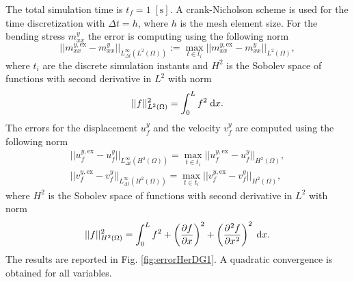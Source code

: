 \documentclass{svjour3}                     %
\begin{document}
{\begin{table}[tbh]
\begin{tabular}{ccccc}
		\hline 
	\end{tabular} 
	\captionsetup{width=0.95\linewidth}
	\vspace{1mm}
	\label{tab:parEB}
\end{table}
The total simulation time is $t_f = 1 \; [\mathrm{s}]$. A crank-Nicholson scheme is used for the time discretization with $\Delta t = h$, where $h$ is the mesh element size. For the bending stress $m_{xx}^y$ the error is computing using the following norm
\begin{equation*}
||m_{xx}^{y, \text{ex}} -  m_{xx}^{y}||_{L^\infty_{\Delta t} (L^2(\Omega))} := \max_{t \in t_i} ||m_{xx}^{y, \text{ex}} -  m_{xx}^{y}||_{L^2(\Omega)}, 
\end{equation*}
where $t_i$ are the discrete simulation instants and $H^2$ is the Sobolev space of functions with second derivative in $L^2$ with norm
\begin{equation*}
||f||^2_{L^2(\Omega)} = \int_{0}^{L} f^2\d{x}.
\end{equation*}
The errors for the displacement $u_f^{y}$ and the velocity $v_f^{y}$ are computed using the following norm
\begin{equation*}
\begin{aligned}
||u_f^{y, \text{ex}} -  u_f^{y}||_{L^\infty_{\Delta t} (H^2(\Omega))} = \max_{t \in t_i} ||u_f^{y, \text{ex}} -  u_f^{y}||_{H^2(\Omega)}, \\
||v_f^{y, \text{ex}} -  v_f^{y}||_{L^\infty_{\Delta t} (H^2(\Omega))} = \max_{t \in t_i} ||v_f^{y, \text{ex}} -  v_f^{y}||_{H^2(\Omega)}, 
\end{aligned}	
\end{equation*}
where $H^2$ is the Sobolev space of functions with second derivative in $L^2$ with norm
\begin{equation*}
||f||^2_{H^2(\Omega)} = \int_{0}^{L} f^2 + \left(\diffp{f}{x}\right)^2 + \left(\diffp[2]{f}{x}\right)^2 \d{x}.
\end{equation*}
 The results are reported in Fig. \ref{fig:errorHerDG1}. A quadratic convergence is obtained for all variables.
\begin{figure}[tbh]%
	\centering

\end{figure}}
\end{document}
